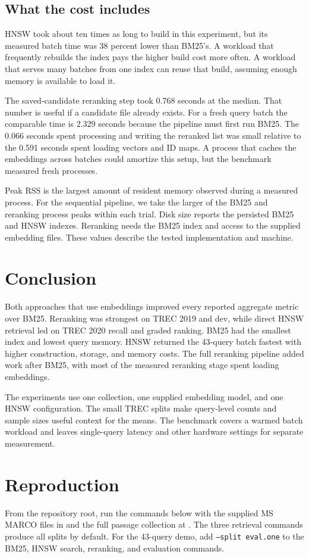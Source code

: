 \documentclass[11pt,letterpaper]{article}
\begin{document}
\subsection{What the cost includes}
HNSW took about ten times as long to build in this experiment, but its measured batch time was 38 percent lower than BM25's. A workload that frequently rebuilds the index pays the higher build cost more often. A workload that serves many batches from one index can reuse that build, assuming enough memory is available to load it.

The saved-candidate reranking step took 0.768 seconds at the median. That number is useful if a candidate file already exists. For a fresh query batch the comparable time is 2.329 seconds because the pipeline must first run BM25. The 0.066 seconds spent processing and writing the reranked list was small relative to the 0.591 seconds spent loading vectors and ID maps. A process that caches the embeddings across batches could amortize this setup, but the benchmark measured fresh processes.

Peak RSS is the largest amount of resident memory observed during a measured process. For the sequential pipeline, we take the larger of the BM25 and reranking process peaks within each trial. Disk size reports the persisted BM25 and HNSW indexes. Reranking needs the BM25 index and access to the supplied embedding files. These values describe the tested implementation and machine.

\newpage

\section{Conclusion}
Both approaches that use embeddings improved every reported aggregate metric over BM25. Reranking was strongest on TREC 2019 and dev, while direct HNSW retrieval led on TREC 2020 recall and graded ranking. BM25 had the smallest index and lowest query memory. HNSW returned the 43-query batch fastest with higher construction, storage, and memory costs. The full reranking pipeline added work after BM25, with most of the measured reranking stage spent loading embeddings.

The experiments use one collection, one supplied embedding model, and one HNSW configuration. The small TREC splits make query-level counts and sample sizes useful context for the means. The benchmark covers a warmed batch workload and leaves single-query latency and other hardware settings for separate measurement.
\section{Reproduction}
From the repository root, run the commands below with the supplied MS MARCO files in  and the full passage collection at . The three retrieval commands produce all splits by default. For the 43-query demo, add \texttt{--split eval.one} to the BM25, HNSW search, reranking, and evaluation commands.
\end{document}

